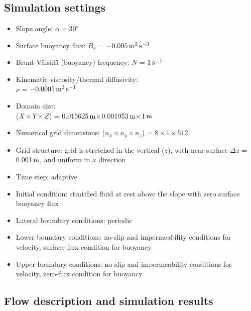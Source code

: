\documentclass[gmd]{copernicus}
\begin{document}
\subsection{Simulation settings}

\begin{itemize}
  
  \setlength{\itemsep}{0pt}
  \setlength{\parskip}{0pt}
  \setlength{\parsep}{0pt} 
  \item Slope angle: $\alpha = 30^{\circ}$
  \item Surface buoyancy flux: $B_{s} $ = $-0.005{\rm\, m}^{\rm 2}\, {\rm s}^{{\rm -3}} $
  \item Brunt-V\"{a}is\"{a}l\"{a} (buoyancy) frequency: $N$ = $1\,{\rm s}^{{\rm -1}}$
  \item Kinematic viscosity/thermal diffusivity: \\$\nu$ = $-0.0005{\rm\, m}^{\rm 2}\, {\rm s}^{{\rm -1}} $
  \item Domain size: \\($X{\times}Y{\times}Z$) = 0.015625${\rm\, m}\times$0.001953${\rm\, m}\times$1${\rm\, m}$
  \item Numerical grid dimensions: ($n_x{\times}n_y{\times}n_z$) = $8 \times 1 \times 512$
  \item Grid structure: grid is stretched in the vertical ($z$), with near-surface $\Delta z$ = 0.001${\rm\, m}$, and uniform in $x$ direction  
  \item Time step: adaptive
  \item Initial condition: stratified fluid at rest above the slope with zero surface buoyancy flux
  \item Lateral boundary conditions: periodic
  \item Lower boundary conditions: no-slip and impermeability conditions for velocity, surface-flux condition for buoyancy
  \item Upper boundary conditions: no-slip and impermeability conditions for velocity, zero-flux condition for buoyancy
\end{itemize}

\subsection{Flow description and simulation results}
\end{document}
